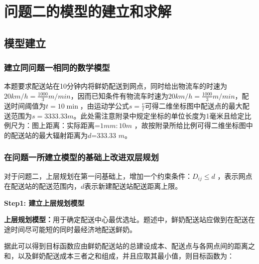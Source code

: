 \documentclass[withoutpreface,bwprint]{cumcmthesis} %
\begin{document}
	\section{问题二的模型的建立和求解}
	\subsection{模型建立}

	\subsubsection{建立同问题一相同的数学模型}
本题要求配送站在10分钟内将鲜奶配送到网点，同时给出物流车的时速为$20km/h=\frac{1000}{3}m/min$，因而已知条件有物流车时速为$20km/h=\frac{1000}{3}m/min$，配送时间阈值为$t=10\min{}$，由运动学公式$s=\frac{v}{t}$可得二维坐标图中配送点的最大配送范围为$s=3333.33m$。此处需注意附录中规定坐标的单位长度为1毫米且给定比例尺为：图上距离：实际距离=$1mm:10m$ ，故按附录所给比例可得二维坐标图中的配送站的最大辐射距离为$d$=333.33 $m$。
	
	\subsubsection{在问题一所建立模型的基础上改进双层规划}
对于问题二，上层规划在第一问基础上，增加一个约束条件：${{D}_{ij}} \le d$ ，表示网点在配送站的配送范围内，$d$表示新建配送站配送距离上限。

\textbf{Step1: 建立上层规划模型}

\textbf{上层规划模型：}用于确定配送中心最优选址。题述中，鲜奶配送站应做到在配送在途时间尽可能短的同时最经济地配送鲜奶。

据此可以得到目标函数应由鲜奶配送站的总建设成本、配送点与各网点间的距离之和，以及鲜奶配送成本三者之和组成，并且应取其最小值，则目标函数为：
	
\end{document}
